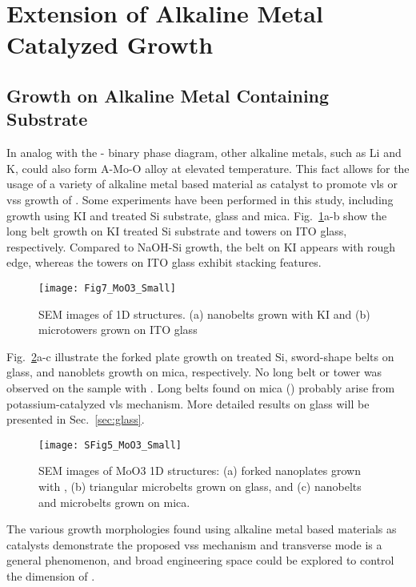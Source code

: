 \section{Extension of Alkaline Metal Catalyzed Growth}
\subsection{Growth on Alkaline Metal Containing Substrate}
In analog with the - binary phase diagram, other alkaline metals, such as Li and K, could also form A-Mo-O alloy at elevated temperature. This fact allows for the usage of a variety of alkaline metal based material as catalyst to promote \gls{vls} or \gls{vss} growth of . Some experiments have been performed in this study, including growth using KI and  treated Si substrate, glass and mica. Fig.~\ref{fig:ch4al1}a-b show the long belt growth on KI treated Si substrate and towers on ITO glass, respectively. Compared to NaOH-Si growth, the belt on KI appears with rough edge, whereas the towers on ITO glass exhibit stacking features. 

\begin{figure}[htb]
\centering
\texttt{[image: Fig7\_MoO3\_Small]}
\caption[Alternative catalysts for  growth 1]{SEM images of  1D structures. (a) nanobelts grown with KI and (b) microtowers grown on ITO glass}
\label{fig:ch4al1}
\end{figure}

Fig.~\ref{fig:ch4al2}a-c illustrate the forked plate growth on  treated Si, sword-shape belts on glass, and nanoblets growth on mica, respectively. No long belt or tower was observed on the sample with . Long belts found on mica () probably arise from potassium-catalyzed \gls{vls} mechanism.\cite{Hu2011} More detailed results on glass will be presented in Sec.~\ref{sec:glass}. 

\begin{figure}[htb]
\centering
\texttt{[image: SFig5\_MoO3\_Small]}
\caption[Alternative catalysts for  growth 2]{SEM images of MoO3 1D structures: (a) forked nanoplates grown with , (b) triangular microbelts grown on glass, and (c) nanobelts and microbelts grown on mica.}
\label{fig:ch4al2}
\end{figure}

The various growth morphologies found using alkaline metal based materials as catalysts demonstrate the proposed \gls{vss} mechanism and transverse mode is a general phenomenon, and broad engineering space could be explored to control the dimension of . 

